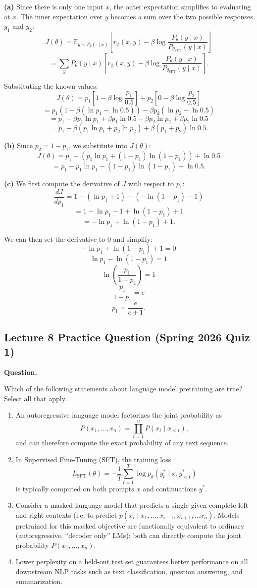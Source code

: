 \documentclass[10pt]{article}
\begin{document}
\textbf{(a)} Since there is only one input \(x\), the outer expectation simplifies to evaluating
at \(x\). The inner expectation over \(y\) becomes a sum over the two possible responses \(y_1\) and
\(y_2\):
\[
J(\theta)
=
\mathbb{E}_{y \sim P_\theta(\cdot \mid x)}
\left[
r_\phi(x,y)-\beta \log \frac{P_\theta(y \mid x)}{P_{\theta_{\mathrm{SFT}}}(y \mid x)}
\right]
\]
\[
=
\sum_y
P_\theta(y \mid x)
\left[
r_\phi(x,y)-\beta \log \frac{P_\theta(y \mid x)}{P_{\theta_{\mathrm{SFT}}}(y \mid x)}
\right].
\]

Substituting the known values:
\[
J(\theta)
=
p_1\left[1-\beta \log \frac{p_1}{0.5}\right]
+
p_2\left[0-\beta \log \frac{p_2}{0.5}\right]
\]
\[
=
p_1(1-\beta(\ln p_1-\ln 0.5))-\beta p_2(\ln p_2-\ln 0.5)
\]
\[
=
p_1-\beta p_1 \ln p_1+\beta p_1 \ln 0.5-\beta p_2 \ln p_2+\beta p_2 \ln 0.5
\]
\[
=
p_1-\beta(p_1 \ln p_1+p_2 \ln p_2)+\beta(p_1+p_2)\ln 0.5.
\]

\textbf{(b)} Since \(p_2 = 1-p_1\), we substitute into \(J(\theta)\):
\[
J(\theta)
=
p_1-(p_1 \ln p_1+(1-p_1)\ln(1-p_1))+\ln 0.5
\]
\[
=
p_1-p_1\ln p_1-(1-p_1)\ln(1-p_1)+\ln 0.5.
\]

\textbf{(c)} We first compute the derivative of \(J\) with respect to \(p_1\):
\[
\frac{dJ}{dp_1}
=
1-(\ln p_1+1)-(-\ln(1-p_1)-1)
\]
\[
=
1-\ln p_1-1+\ln(1-p_1)+1
\]
\[
=
-\ln p_1+\ln(1-p_1)+1.
\]

We can then set the derivative to 0 and simplify:
\[
-\ln p_1+\ln(1-p_1)+1=0
\]
\[
\ln p_1-\ln(1-p_1)=1
\]
\[
\ln \left(\frac{p_1}{1-p_1}\right)=1
\]
\[
\frac{p_1}{1-p_1}=e
\]
\[
p_1=\frac{e}{e+1}.
\]

\subsection*{Lecture 8 Practice Question (Spring 2026 Quiz 1)}
\textbf{Question.}

Which of the following statements about language model pretraining are true? Select all that
apply.
\begin{enumerate}
\item[(a)] An autoregressive language model factorizes the joint probability as
\[
P(x_1,\ldots,x_n)=\prod_{t=1}^n P(x_t \mid x_{<t}),
\]
and can therefore compute the exact probability of any text sequence.
\item[(b)] In Supervised Fine-Tuning (SFT), the training loss
\[
L_{\mathrm{SFT}}(\theta)=-\frac{1}{T}\sum_{t=1}^T \log p_\theta(y_t^\ast \mid x, y_{<t}^\ast)
\]
is typically computed on both prompts \(x\) and continuations \(y^\ast\).
\item[(c)] Consider a masked language model that predicts a single given complete left and right
contexts (i.e. to predict \(p(x_i \mid x_1,\ldots,x_{i-1},x_{i+1},\ldots x_n)\). Models pretrained for this masked
objective are functionally equivalent to ordinary (autoregressive, ``decoder only'' LMs): both
can directly compute the joint probability \(P(x_1,\ldots,x_n)\).
\item[(d)] Lower perplexity on a held-out test set guarantees better performance on all downstream
NLP tasks such as text classification, question answering, and summarization.
\end{enumerate}
\end{document}
